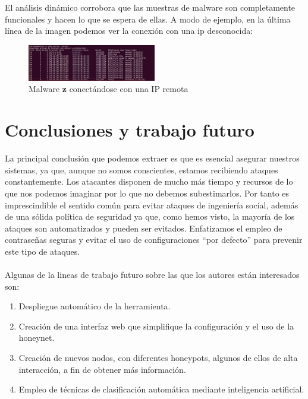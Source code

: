 \documentclass[journal]{IEEEtran}
\begin{document}
El análisis dinámico corrobora que las muestras de malware son completamente funcionales y hacen lo que se espera de ellas. A modo de ejemplo, en la última línea de la imagen podemos ver la conexión con una ip desconocida:
\begin{figure}[H]
\centering
\includegraphics[width=0.5\textwidth]{img/netstat}
\caption{Malware {\bf z} conectándose con una IP remota}
\label{fig:netstat}
\end{figure}
\section{Conclusiones y trabajo futuro}
La principal conclusión que podemos extraer es que es esencial asegurar nuestros sistemas, ya que, aunque no somos conscientes, estamos recibiendo ataques constantemente. Los atacantes disponen de mucho más tiempo y recursos de lo que nos podemos imaginar por lo que no debemos subestimarlos. Por tanto es imprescindible el sentido común para evitar ataques de ingeniería social, además de una sólida política de seguridad ya que, como hemos visto, la mayoría de los ataques son automatizados y pueden ser evitados. Enfatizamos el empleo de contraseñas seguras y evitar el uso de configuraciones “por defecto” para prevenir este tipo de ataques.
\\\\
Algunas de la lineas de trabajo futuro sobre las que los autores están interesados son:
\begin{enumerate}
\item Despliegue automático de la herramienta.
\item Creación de una interfaz web que simplifique la configuración y el uso de la honeynet.
\item Creación de nuevos nodos, con diferentes honeypots, algunos de ellos de alta interacción, a fin de obtener más información.
\item Empleo de técnicas de clasificación automática mediante inteligencia artificial.
\end{enumerate}

\ifCLASSOPTIONcaptionsoff
  \newpage
\fi
\end{document}
